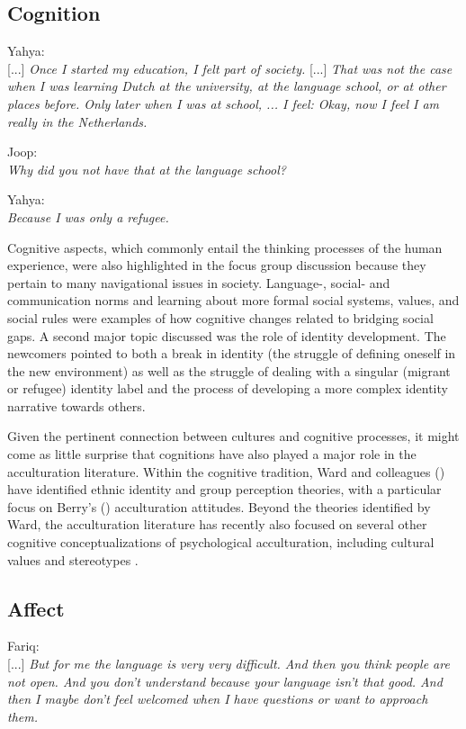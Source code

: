 \documentclass[man, 12pt, a4paper, mask]{apa7}
\begin{document}
\subsection{Cognition}
\begin{displayquote}
    Yahya:\\
    {[...]} \textit{Once I started my education, I felt part of society.} {[...]} \textit{That was not the case when I was learning Dutch at the university, at the language school, or at other places before. Only later when I was at school, ... I feel: Okay, now I feel I am really in the Netherlands.}
    
    Joop:\\
    \textit{Why did you not have that at the language school?}
    
    Yahya:\\
    \textit{Because I was only a refugee.}
\end{displayquote}

Cognitive aspects, which commonly entail the thinking processes of the human experience, were also highlighted in the focus group discussion because they pertain to many navigational issues in society. Language-, social- and communication norms and learning about more formal social systems, values, and social rules were examples of how cognitive changes related to bridging social gaps. A second major topic discussed was the role of identity development. The newcomers pointed to both a break in identity (the struggle of defining oneself in the new environment) as well as the struggle of dealing with a singular (migrant or refugee) identity label and the process of developing a more complex identity narrative towards others.

Given the pertinent connection between cultures and cognitive processes, it might come as little surprise that cognitions have also played a major role in the acculturation literature. Within the cognitive tradition, Ward and colleagues (\citeyear{Ward2001, Ward2019}) have identified ethnic identity and group perception theories, with a particular focus on Berry's (\citeyear{Berry1997b}) acculturation attitudes. Beyond the theories identified by Ward, the acculturation literature has recently also focused on several other cognitive conceptualizations of psychological acculturation, including cultural values \citep[e.g.,][]{Marin2003} and stereotypes \citep[e.g.,][]{Stanciu2018}. 

\subsection{Affect}
\begin{displayquote}
    Fariq:\\
    {[...]} \textit{But for me the language is very very difficult. And then you think people are not open. And you don't understand because your language isn't that good. And then I maybe don't feel welcomed when I have questions or want to approach them.}
\end{displayquote}
\end{document}
